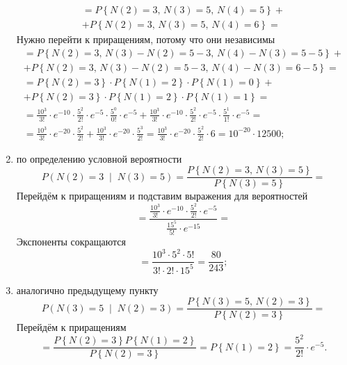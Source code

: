 \begin{enumerate}[label=\alph*)]
\begin{gather*}
    = P \left\{
      N \left( 2 \right) = 3, \, N \left( 3 \right) = 5, \, N \left( 4 \right) = 5 \right\} + \\
    + P \left\{
      N \left( 2 \right) = 3, \, N \left( 3 \right) = 5, \, N \left( 4 \right) = 6 \right\} =
  \end{gather*}
  Нужно перейти к приращениям, потому что они независимы
  \begin{gather*}
    = P \left\{
      N \left( 2 \right) = 3, \, N \left( 3 \right) - N \left( 2 \right) = 5 - 3, \,
      N \left( 4 \right) - N \left( 3 \right) = 5 - 5 \right\} + \\
    + P \left\{
      N \left( 2 \right) = 3, \, N \left( 3 \right) - N \left( 2 \right) = 5 - 3, \,
      N \left( 4 \right) - N \left( 3 \right) = 6 - 5 \right\} = \\
    = P \left\{ N \left( 2 \right) = 3 \right\} \cdot P \left\{ N \left( 1 \right) = 2 \right\} \cdot
    P \left\{ N \left( 1 \right) = 0 \right\} + \\
    + P \left\{ N \left( 2 \right) = 3 \right\} \cdot P \left\{ N \left( 1 \right) = 2 \right\} \cdot
    P \left\{ N \left( 1 \right) = 1 \right\} = \\
    = \frac{10^3}{3!} \cdot e^{-10} \cdot \frac{5^2}{2!} \cdot e^{-5} \cdot \frac{5^0}{0!} \cdot
    e^{-5} +
    \frac{10^3}{3!} \cdot e^{-10} \cdot \frac{5^2}{2!} \cdot e^{-5} \cdot \frac{5^1}{1!} \cdot
    e^{-5} = \\
    = \frac{10^3}{3!} \cdot e^{-20} \cdot \frac{5^2}{2!} +
    \frac{10^3}{3!} \cdot e^{-20} \cdot \frac{5^3}{2!} =
    \frac{10^3}{3!} \cdot e^{-20} \cdot \frac{5^2}{2!} \cdot 6 =
    10^{-20} \cdot 12500;
  \end{gather*}
  \item по определению условной вероятности
  $$P \left( N \left( 2 \right) = 3 \; \middle| \; N \left( 3 \right) = 5 \right) =
    \frac{P \left\{ N \left( 2 \right) = 3, \, N \left( 3 \right) = 5 \right\} }{P \left\{ N \left( 3 \right) = 5 \right\} } =$$
  Перейдём к приращениям и подставим выражения для вероятностей
  $$= \frac{ \frac{10^3}{3!} \cdot e^{-10} \cdot \frac{5^2}{2!} \cdot e^{-5}}{ \frac{15^5}{5!} \cdot e^{-15}} =$$
  Экспоненты сокращаются
  $$= \frac{10^3 \cdot 5^2 \cdot 5!}{3! \cdot 2! \cdot 15^5} =
  \frac{80}{243};$$
  \item аналогично предыдущему пункту
  $$P \left( N \left( 3 \right) = 5 \; \middle| \; N \left( 2 \right) = 3 \right) =
    \frac{P \left\{ N \left( 3 \right) = 5, \, N \left( 2 \right) = 3 \right\} }{P \left\{ N \left( 2 \right) = 3 \right\} } =$$
  Перейдём к приращениям
  $$= \frac{P \left\{ N \left( 2 \right) = 3 \right\} P \left\{ N \left( 1 \right) = 2 \right\} }{P \left\{ N \left( 2 \right) = 3 \right\} } =
    P \left\{ N \left( 1 \right) = 2 \right\} =
    \frac{5^2}{2!} \cdot e^{-5}.$$
\end{enumerate}


